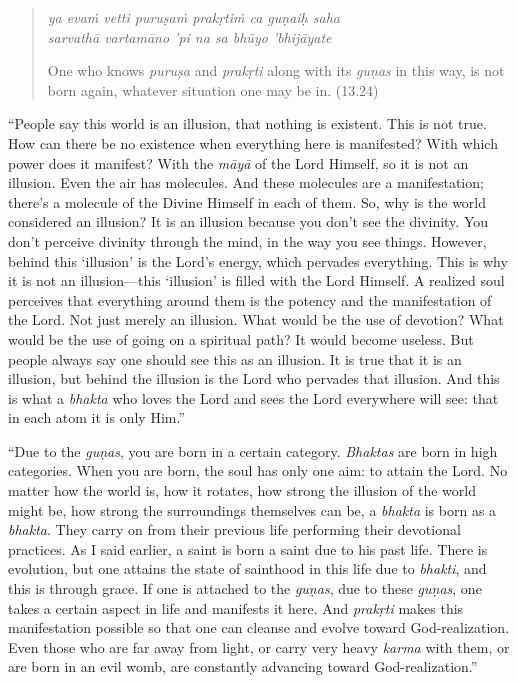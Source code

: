 \documentclass[12pt, twoside, openright]{memoir}
\begin{document}
\par
\begin{verse}
\textit{ya evaṁ vetti puruṣaṁ prakṛtiṁ ca guṇaiḥ saha} \\
\textit{sarvathā vartamāno ’pi na sa bhūyo ’bhijāyate}

\noindent One who knows \textit{puruṣa} and \textit{prakṛti} along with its \textit{guṇas} in this way, is not born again, whatever situation one may be in. (13.24)
\end{verse}
\par


\enquote{People say this world is an illusion, that nothing is existent. This is not true. How can there be no existence when everything here is manifested? With which power does it manifest? With the \textit{māyā} of the Lord Himself, so it is not an illusion. Even the air has molecules. And these molecules are a manifestation; there’s a molecule of the Divine Himself in each of them. So, why is the world considered an illusion? It is an illusion because you don’t see the divinity. You don’t perceive divinity through the mind, in the way you see things. However, behind this \enquote{illusion} is the Lord’s energy, which pervades everything. This is why it is not an illusion---this \enquote{illusion} is filled with the Lord Himself. A realized soul perceives that everything around them is the potency and the manifestation of the Lord. Not just merely an illusion. What would be the use of devotion? What would be the use of going on a spiritual path? It would become useless. But people always say one should see this as an illusion. It is true that it is an illusion, but behind the illusion is the Lord who pervades that illusion. And this is what a \textit{bhakta} who loves the Lord and sees the Lord everywhere will see: that in each atom it is only Him.}

\enquote{Due to the \textit{guṇas}, you are born in a certain category. \textit{Bhaktas} are born in high categories. When you are born, the soul has only one aim: to attain the Lord. No matter how the world is, how it rotates, how strong the illusion of the world might be, how strong the surroundings themselves can be, a \textit{bhakta} is born as a \textit{bhakta}. They carry on from their previous life performing their devotional practices. As I said earlier, a saint is born a saint due to his past life. There is evolution, but one attains the state of sainthood in this life due to \textit{bhakti}, and this is through grace. If one is attached to the \textit{guṇas}, due to these \textit{guṇas}, one takes a certain aspect in life and manifests it here. And \textit{prakṛti} makes this manifestation possible so that one can cleanse and evolve toward God-realization. Even those who are far away from light, or carry very heavy \textit{karma} with them, or are born in an evil womb, are constantly advancing toward God-realization.}
\end{document}
